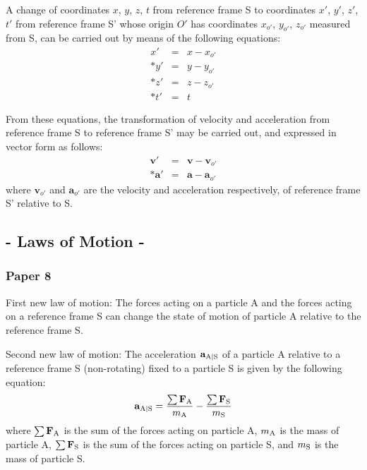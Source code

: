 \documentclass[11pt]{article}
\newcommand{\mX}{x}
\newcommand{\mY}{y}
\newcommand{\mZ}{z}
\newcommand{\mT}{t}
\newcommand{\mm}{m}
\newcommand{\rt}{'}
\newcommand{\rot}{_{o'}}
\newcommand{\vV}{\mathbf{v}}
\newcommand{\vA}{\mathbf{a}}
\newcommand{\vF}{\mathbf{F}}
\newcommand{\ra}{_{\mbox {\scriptsize A}}}
\newcommand{\rs}{_{\mbox {\scriptsize S}}}
\newcommand{\ras}{_{\mbox {\scriptsize {A$\vert$S}}}}
\begin{document}
\smallskip

\par A change of coordinates $\mX$, $\mY$, $\mZ$, $\mT$ from reference frame S to coordinates $\mX\rt$, $\mY\rt$, $\mZ\rt$, $\mT\rt$ from reference frame S' whose origin $O\rt$ has coordinates $\mX\rot$, $\mY\rot$, $\mZ\rot$ measured from S, can be carried out by means of the following equations:
\begin{eqnarray*}
\mX\rt & = & \mX - \mX\rot \\*
\mY\rt & = & \mY - \mY\rot \\*
\mZ\rt & = & \mZ - \mZ\rot \\*
\mT\rt & = & \mT
\end{eqnarray*}
\par From these equations, the transformation of velocity and acceleration from reference frame S to reference frame S' may be carried out, and expressed in vector form as follows:
\begin{eqnarray*}
\vV\rt & = & \vV - \vV\rot \\*
\vA\rt & = & \vA - \vA\rot
\end{eqnarray*}
\noindent where $\vV\rot$ and $\vA\rot$ are the velocity and acceleration respectively, of reference frame S' relative to S.

\newpage

{\centering\subsection*{- Laws of Motion -}}

{\centering\subsubsection*{Paper 8}}

\medskip
\par First new law of motion: The forces acting on a particle A and the forces acting on a reference frame S can change the state of motion of particle A relative to the reference frame S.
\medskip
\par Second new law of motion: The acceleration $\vA\ras$ of a particle A relative to a reference frame S (non-rotating) fixed to a particle S is given by the following equation:
\begin{eqnarray*}
\vA\ras = \frac{\sum \vF\ra}{\mm\ra} - \frac{\sum \vF\rs}{\mm\rs}
\end{eqnarray*}
\noindent where $\sum \vF\ra$ is the sum of the forces acting on particle A, $\mm\ra$ is the mass of particle A, $\sum \vF\rs$ is the sum of the forces acting on particle S, and $\mm\rs$ is the mass of particle S.
\end{document}

